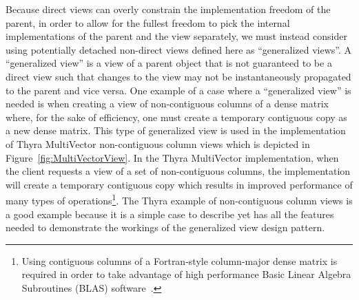 \documentclass[pdf,ps2pdf,11pt]{SANDreport}
\begin{document}
Because direct views can overly constrain the implementation freedom
of the parent, in order to allow for the fullest freedom to pick the
internal implementations of the parent and the view separately, we
must instead consider using potentially detached non-direct views
defined here as ``generalized views''.  A ``generalized view'' is a
view of a parent object that is not guaranteed to be a direct view
such that changes to the view may not be instantaneously propagated to
the parent and vice versa.  One example of a case where a
``generalized view'' is needed is when creating a view of
non-contiguous columns of a dense matrix where, for the sake of
efficiency, one must create a temporary contiguous copy as a new dense
matrix.  This type of generalized view is used in the implementation
of Thyra MultiVector non-contiguous column views
{}\cite{ThyraOperatorVectorSAND} which is depicted in
Figure~\ref{fig:MultiVectorView}. In the Thyra MultiVector
implementation, when the client requests a view of a set of
non-contiguous columns, the implementation will create a temporary
contiguous copy which results in improved performance of many types of
operations\footnote{Using contiguous columns of a Fortran-style
column-major dense matrix is required in order to take advantage of
high performance Basic Linear Algebra Subroutines (BLAS)
software~\cite{ref:demmel_1997}.}.  The Thyra example of
non-contiguous column views is a good example because it is a simple
case to describe yet has all the features needed to demonstrate the
workings of the generalized view design pattern.
\end{document}
